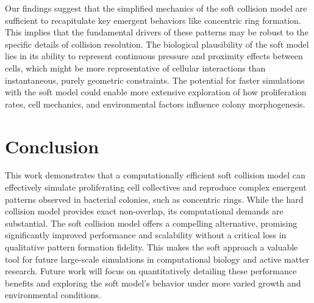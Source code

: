 \documentclass[conference]{IEEEtran}
\begin{document}
Our findings suggest that the simplified mechanics of the soft collision model are sufficient to recapitulate key emergent behaviors like concentric ring formation. This implies that the fundamental drivers of these patterns may be robust to the specific details of collision resolution. The biological plausibility of the soft model lies in its ability to represent continuous pressure and proximity effects between cells, which might be more representative of cellular interactions than instantaneous, purely geometric constraints. The potential for faster simulations with the soft model could enable more extensive exploration of how proliferation rates, cell mechanics, and environmental factors influence colony morphogenesis.

\newpage

\section{Conclusion}

This work demonstrates that a computationally efficient soft collision model can effectively simulate proliferating cell collectives and reproduce complex emergent patterns observed in bacterial colonies, such as concentric rings. While the hard collision model provides exact non-overlap, its computational demands are substantial. The soft collision model offers a compelling alternative, promising significantly improved performance and scalability without a critical loss in qualitative pattern formation fidelity. This makes the soft approach a valuable tool for future large-scale simulations in computational biology and active matter research. Future work will focus on quantitatively detailing these performance benefits and exploring the soft model's behavior under more varied growth and environmental conditions.

\newpage
\tableofcontents




\end{document}
